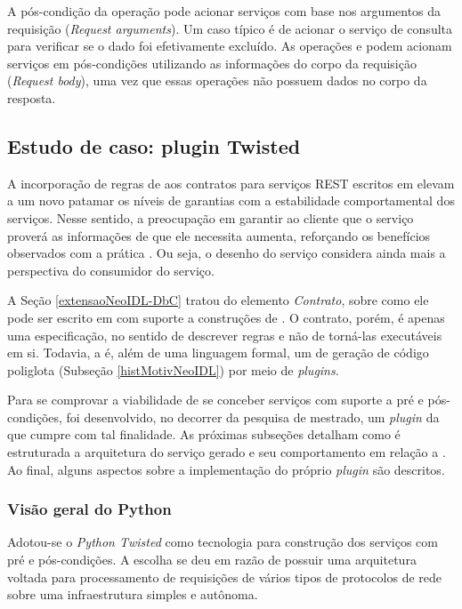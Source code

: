 A pós-condição da operação  pode acionar serviços com base nos
argumentos da requisição (\textit{Request arguments}). Um caso típico é de
acionar o serviço de consulta para verificar se o dado foi efetivamente
excluído. As operações  e  podem acionam serviços em
pós-condições utilizando as informações do corpo da requisição (\textit{Request
body}), uma vez que essas operações não possuem dados no corpo da resposta. 

\subsection{Estudo de caso: plugin Twisted}
\label{pluginTwisted}

A incorporação de regras de \designbycontract{} aos contratos para
serviços REST escritos em \neoidl{} elevam a um novo patamar os níveis de
garantias com a estabilidade comportamental dos serviços. Nesse sentido, a
preocupação em garantir ao cliente que o serviço proverá as informações de que
ele necessita aumenta, reforçando os benefícios observados com a prática
\CtFirst{}. Ou seja, o desenho do serviço considera ainda mais a perspectiva do
consumidor do serviço.

A Seção \ref{extensaoNeoIDL-DbC} tratou do elemento \emph{Contrato}, sobre como
ele pode ser escrito em \neoidl{} com suporte a construções de
\designbycontract{}. O contrato, porém, é apenas uma especificação, no
sentido de descrever regras e não de torná-las executáveis em si. Todavia, a
\neoidl{} é, além de uma linguagem formal, um \framework{} de geração de
código poliglota (Subseção \ref{histMotivNeoIDL}) por meio de \textit{plugins}.

Para se comprovar a viabilidade de se conceber serviços com suporte a pré e
pós-condições, foi desenvolvido, no decorrer da pesquisa de mestrado, um
\textit{plugin} da \neoidl{} que cumpre com tal finalidade. As próximas
subseções detalham como é estruturada a arquitetura do serviço gerado e seu comportamento em relação a
\designbycontract{}. Ao final, alguns aspectos sobre a implementação do
próprio \textit{plugin} são descritos.

\subsubsection{Visão geral do Python \twisted{}}
\label{PythonTwisted}

Adotou-se o \framework{} \emph{Python Twisted}\cite{fettig2005twisted} como tecnologia para
construção dos serviços com pré e pós-condições. A escolha se deu em razão de
\twisted{} possuir uma arquitetura voltada para processamento de requisições de vários
tipos de protocolos de rede sobre uma infraestrutura simples e autônoma. 

